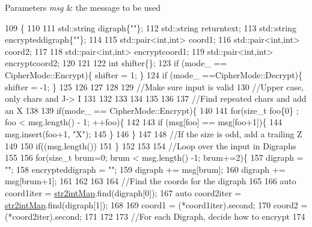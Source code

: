 \begin{DoxyParams}{Parameters}
{\em msg} & the message to be used \\
\hline
\end{DoxyParams}

\begin{DoxyCode}
109                                               \{
110 
111   std::string digraph\{\textcolor{stringliteral}{""}\};
112   std::string returntext;
113   std::string encrypteddigraph\{\textcolor{stringliteral}{""}\};
114 
115   std::pair<int,int> coord1;
116   std::pair<int,int> coord2;
117 
118   std::pair<int,int> encryptcoord1;
119   std::pair<int,int> encryptcoord2;
120   
121 
122   \textcolor{keywordtype}{int} shifter\{\};
123   \textcolor{keywordflow}{if} (mode\_ == CipherMode::Encrypt)\{ shifter = 1; \}
124   \textcolor{keywordflow}{if} (mode\_ ==CipherMode::Decrypt)\{ shifter = -1; \}
125   
126 
127   
128 
129   \textcolor{comment}{//Make sure input is valid}
130   \textcolor{comment}{//Upper case, only chars and J-> I}
131 
132 
133 
134 
135 
136 
137   \textcolor{comment}{//Find repeated chars and add an X}
138 
139   \textcolor{keywordflow}{if}(mode\_ == CipherMode::Encrypt)\{
140   
141   \textcolor{keywordflow}{for}(\textcolor{keywordtype}{size\_t} foo\{0\} ; foo < msg.length() - 1; ++foo)\{
142 
143     \textcolor{keywordflow}{if} (msg[foo] == msg[foo+1])\{
144       msg.insert(foo+1, \textcolor{stringliteral}{"X"});
145     \}
146   \}
147 
148   \textcolor{comment}{//If the size is odd, add a trailing Z}
149 
150   \textcolor{keywordflow}{if}((msg.length())%
151   \}
152 
153   
154   \textcolor{comment}{//Loop over the input in Digraphs}
155 
156     \textcolor{keywordflow}{for}(\textcolor{keywordtype}{size\_t} brum=0; brum < msg.length() -1; brum+=2)\{
157       digraph = \textcolor{stringliteral}{""};
158       encrypteddigraph = \textcolor{stringliteral}{""};
159       digraph += msg[brum];
160       digraph += msg[brum+1];
161 
162       
163 
164       \textcolor{comment}{//Find the coords for the digraph}
165       
166       \textcolor{keyword}{auto} coord1iter = \hyperlink{class_playfair_cipher_a3171ced3a7a56d8fcf57e99d760db715}{str2intMap}.find(digraph[0]);
167       \textcolor{keyword}{auto} coord2iter = \hyperlink{class_playfair_cipher_a3171ced3a7a56d8fcf57e99d760db715}{str2intMap}.find(digraph[1]);
168 
169       coord1 = (*coord1iter).second;
170       coord2 = (*coord2iter).second;
171  
172      
173   \textcolor{comment}{//For each Digraph, decide how to encrypt}
174 

\end{DoxyCode}
